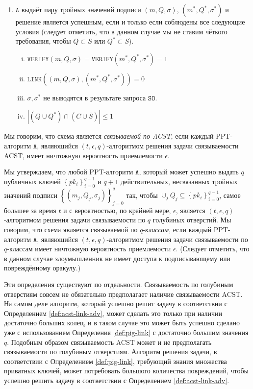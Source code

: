 \documentclass{llncs}
\newcommand{\A}{\texttt{A}}
\begin{document}
\begin{definition}
\begin{enumerate}
\item $\A$ выдаёт пару тройных значений подписи $(m, Q, \sigma)$, $(m^*, Q^*, \sigma^*)$ и решение является успешным, если и только если соблюдены все следующие условия (следует отметить, что в данном случае мы не ставим чёткого требования, чтобы $Q \subset S$ или $Q^* \subset S$).
    \begin{enumerate}[(i)]
        \item $\texttt{VERIFY}(m, Q, \sigma) = \texttt{VERIFY}(m^*, Q^*, \sigma^*) = 1$
        \item $\texttt{LINK}((m, Q, \sigma), (m^*, Q^*, \sigma^*)) = 0$
        \item $\sigma, \sigma^*$ не выводятся в результате запроса $\texttt{SO}$.
        \item $\left|(Q \cup Q^* ) \cap (C \cup \overline{S})\right| \leq 1$
    \end{enumerate}
\end{enumerate}
Мы говорим, что схема является \textit{связываемой по ACST}, если каждый PPT-алгоритм $\A$, являющийся $(t, \epsilon, q)$-алгоритмом решения задачи связываемости ACST, имеет ничтожную вероятность приемлемости $\epsilon$.
\end{definition}

\begin{definition}\label{def:pig-link}
Мы \linebreak утверждаем, что любой PPT-алгоритм $\A$, который может успешно выдать $q$ публичных ключей $\left\{pk_i\right\}_{i=0}^{q-1}$ и $q + 1$ действительных, несвязанных тройных значений подписи $\left\{(m_j, Q_j, \sigma_j)\right\}_{j=0}^{q}$ так, чтобы $\cup_j Q_j \subseteq \left\{pk_i\right\}_{i=0}^{q-1}$, самое большее за время $t$ и с вероятностью, по крайней мере, $\epsilon$, является $(t, \epsilon, q)$-алгоритмом решения задачи связываемости по $q$ голубиных отверстий. Мы говорим, что схема является связываемой по $q$-\textit{классам}, если каждый PPT-алгоритм $\A$, являющийся $(t, \epsilon, q)$-алгоритмом решения задачи связываемости по $q$-классам имеет ничтожную вероятность приемлемости $\epsilon$. (Следует отметить, что в данном случае злоумышленник не имеет доступа к подписывающему или повреждённому оракулу.)
\end{definition}

Эти определения существуют по отдельности. Связываемость по голубиным отверстиям совсем не обязательно предполагает наличие связываемости ACST. На самом деле алгоритм, который успешно решит задачу в соответствии с Определением \ref{def:acst-link-adv}, может сделать это только при наличии достаточно больших колец, и в таком случае это может быть успешно сделано уже с использованием Определения \ref{def:pig-link} с достаточно большим значения $q$. Подобным образом связываемость ACST может и не предполагать связываемости по голубиным отверстиям. Алгоритм решения задачи, в соответствии с Определением \ref{def:pig-link}, требующий знания множества приватных ключей, может потребовать большого количества повреждений, чтобы успешно решить задачу в соответствии с Определением \ref{def:acst-link-adv}.
\end{document}
